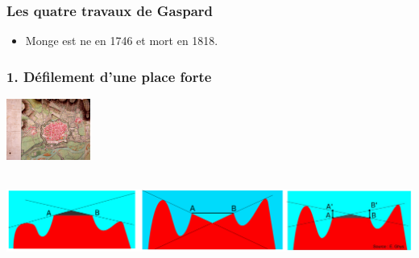\documentclass[9pt]{beamer}
\begin{document}
\begin{frame}
\frametitle{\bf Les quatre travaux de Gaspard}

\begin{itemize}
  \item Monge est ne en 1746 et mort en 1818. 
\end{itemize}
 
\end{frame}

\begin{frame}
\frametitle{\bf 1. D\'efilement d'une place forte}
 
\centering \includegraphics[height=2.0cm]{defil1}

\centering \includegraphics[height=3.0cm]{defil2}

\end{frame}
\end{document}
